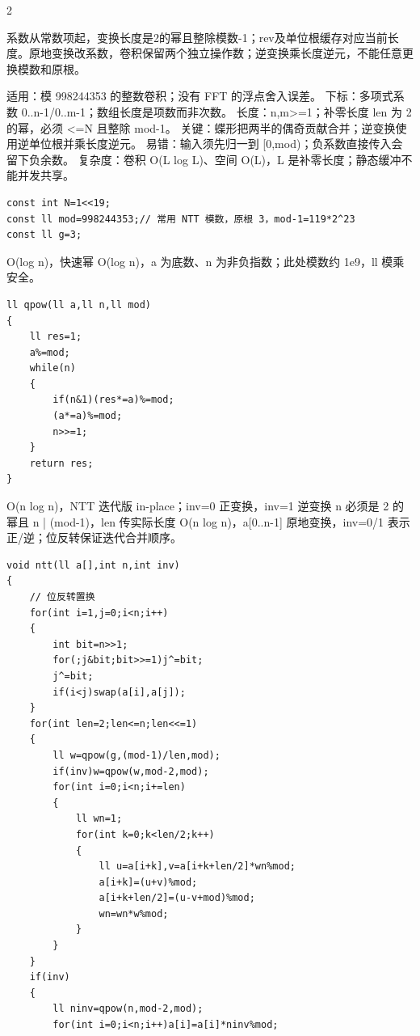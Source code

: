\documentclass[UTF8,fontset=fandol,a4paper,twoside]{ctexart}
\newcommand{\note}[1]{{\fontsize{10}{12}\selectfont #1\par}}
\begin{document}
\begin{multicols}{2}
\note{系数从常数项起，变换长度是2的幂且整除模数-\allowbreak{}1；rev及单位根缓存对应当前长度。原地变换改系数，卷积保留两个独立操作数；逆变换乘长度逆元，不能任意更换模数和原根。}
\note{适用：模 998244353 的整数卷积；没有 FFT 的浮点舍入误差。 下标：多项式系数 0.\allowbreak{}.\allowbreak{}n-\allowbreak{}1/\allowbreak{}0.\allowbreak{}.\allowbreak{}m-\allowbreak{}1；数组长度是项数而非次数。 长度：n,\allowbreak{}m>\allowbreak{}=\allowbreak{}1；补零长度 len 为 2 的幂，必须 <\allowbreak{}=\allowbreak{}N 且整除 mod-\allowbreak{}1。 关键：蝶形把两半的偶奇贡献合并；逆变换使用逆单位根并乘长度逆元。 易错：输入须先归一到 [\allowbreak{}0,\allowbreak{}mod)\allowbreak{}；负系数直接传入会留下负余数。 复杂度：卷积 O(\allowbreak{}L log L)\allowbreak{}、空间 O(\allowbreak{}L)\allowbreak{}，L 是补零长度；静态缓冲不能并发共享。}
\begin{lstlisting}
const int N=1<<19;
const ll mod=998244353;// 常用 NTT 模数，原根 3，mod-1=119*2^23
const ll g=3;
\end{lstlisting}
\note{O(\allowbreak{}log n)\allowbreak{}，快速幂 O(\allowbreak{}log n)\allowbreak{}，a 为底数、n 为非负指数；此处模数约 1e9，ll 模乘安全。}
\begin{lstlisting}
ll qpow(ll a,ll n,ll mod)
{
    ll res=1;
    a%=mod;
    while(n)
    {
        if(n&1)(res*=a)%=mod;
        (a*=a)%=mod;
        n>>=1;
    }
    return res;
}
\end{lstlisting}
\note{O(\allowbreak{}n log n)\allowbreak{}，NTT 迭代版 in-\allowbreak{}place；inv=\allowbreak{}0 正变换，inv=\allowbreak{}1 逆变换 n 必须是 2 的幂且 n | (\allowbreak{}mod-\allowbreak{}1)\allowbreak{}，len 传实际长度 O(\allowbreak{}n log n)\allowbreak{}，a[\allowbreak{}0.\allowbreak{}.\allowbreak{}n-\allowbreak{}1]\allowbreak{} 原地变换，inv=\allowbreak{}0/\allowbreak{}1 表示正/\allowbreak{}逆；位反转保证迭代合并顺序。}
\begin{lstlisting}
void ntt(ll a[],int n,int inv)
{
    // 位反转置换
    for(int i=1,j=0;i<n;i++)
    {
        int bit=n>>1;
        for(;j&bit;bit>>=1)j^=bit;
        j^=bit;
        if(i<j)swap(a[i],a[j]);
    }
    for(int len=2;len<=n;len<<=1)
    {
        ll w=qpow(g,(mod-1)/len,mod);
        if(inv)w=qpow(w,mod-2,mod);
        for(int i=0;i<n;i+=len)
        {
            ll wn=1;
            for(int k=0;k<len/2;k++)
            {
                ll u=a[i+k],v=a[i+k+len/2]*wn%mod;
                a[i+k]=(u+v)%mod;
                a[i+k+len/2]=(u-v+mod)%mod;
                wn=wn*w%mod;
            }
        }
    }
    if(inv)
    {
        ll ninv=qpow(n,mod-2,mod);
        for(int i=0;i<n;i++)a[i]=a[i]*ninv%mod;

\end{lstlisting}
\end{multicols}
\end{document}
